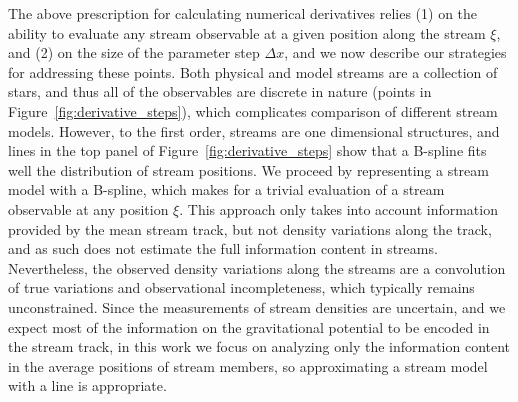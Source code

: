 \documentclass[modern]{aastex61}
\begin{document}
The above prescription for calculating numerical derivatives relies (1) on the ability to evaluate any stream observable at a given position along the stream $\xi$, and (2) on the size of the parameter step $\Delta x$, and we now describe our strategies for addressing these points.
Both physical and model streams are a collection of stars, and thus all of the observables are discrete in nature (points in Figure~\ref{fig:derivative_steps}), which complicates comparison of different stream models.
However, to the first order, streams are one dimensional structures, and lines in the top panel of Figure~\ref{fig:derivative_steps} show that a B-spline fits well the distribution of stream positions.
We proceed by representing a stream model with a B-spline, which makes for a trivial evaluation of a stream observable at any position $\xi$.
This approach only takes into account information provided by the mean stream track, but not density variations along the track, and as such does not estimate the full information content in streams.
Nevertheless, the observed density variations along the streams are a convolution of true variations and observational incompleteness, which typically remains unconstrained.
Since the measurements of stream densities are uncertain, and we expect most of the information on the gravitational potential to be encoded in the stream track, in this work we focus on analyzing only the information content in the average positions of stream members, so approximating a stream model with a line is appropriate.
\end{document}
